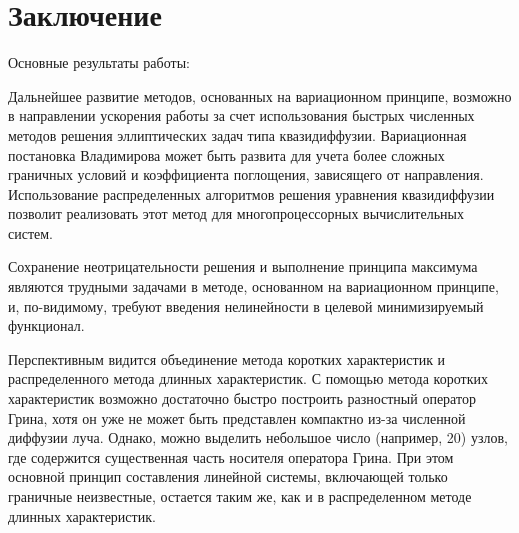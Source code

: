 \chapter*{Заключение}						%


Основные результаты работы:


Дальнейшее развитие методов, основанных на вариационном принципе, возможно в направлении ускорения работы за счет использования быстрых численных методов решения эллиптических задач типа квазидиффузии. Вариационная постановка Владимирова может быть развита для учета более сложных граничных условий и коэффициента поглощения, зависящего от направления. Использование распределенных алгоритмов решения уравнения квазидиффузии позволит реализовать этот метод для многопроцессорных вычислительных систем.

Сохранение неотрицательности решения и выполнение принципа максимума являются трудными задачами в методе, основанном на вариационном принципе, и, по-видимому, требуют введения нелинейности в целевой минимизируемый функционал.

Перспективным видится объединение метода коротких характеристик и распределенного метода длинных характеристик. С помощью метода коротких характеристик возможно достаточно быстро построить разностный оператор Грина, хотя он уже не может быть представлен компактно из-за численной диффузии луча. Однако, можно выделить небольшое число (например, 20) узлов, где содержится существенная часть носителя оператора Грина. При этом основной принцип составления линейной системы, включающей только граничные неизвестные, остается таким же, как и в распределенном методе длинных характеристик.
